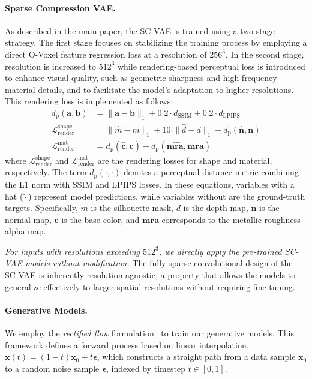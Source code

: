 \documentclass[10pt,twocolumn,letterpaper]{article}
\newcommand{\paravspace}{\vspace{-11pt}}
\begin{document}
\paragraph{Sparse Compression VAE.}
As described in the main paper, the SC-VAE is trained using a two-stage strategy. The first stage focuses on stabilizing the training process by employing a direct O-Voxel feature regression loss at a resolution of $256^3$. In the second stage, resolution is increased to $512^3$ while rendering-based perceptual loss is introduced to enhance visual quality, such as geometric sharpness and high-frequency material details, and to facilitate the model's adaptation to higher resolutions. This rendering loss is implemented as follows:
\begin{equation}
	\begin{split}
        d_{\text{p}}(\boldsymbol{a},\boldsymbol{b}) &= \|\boldsymbol{a}-\boldsymbol{b}\|_1 + 0.2 \cdot d_{\text{SSIM}} + 0.2 \cdot d_{\text{LPIPS}} \\
		\mathcal{L}^{\text{shape}}_{\text{render}} &= \|\hat{m}-m\|_1 + 10 \cdot \|\hat{d}-d\|_1 + d_{\text{p}}(\hat{\boldsymbol{n}}, \boldsymbol{n}) \\
        \mathcal{L}^{\text{mat}}_{\text{render}} &= d_{\text{p}}(\hat{\boldsymbol{c}},\boldsymbol{c}) + d_{\text{p}}(\hat{\boldsymbol{mra}},\boldsymbol{mra})
	\end{split}
	\label{eq:rendering_loss}
\end{equation}
where $\mathcal{L}^{\text{shape}}_{\text{render}}$ and $\mathcal{L}^{\text{mat}}_{\text{render}}$ are the rendering losses for shape and material, respectively. The term $d_{\text{p}}(\cdot, \cdot)$ denotes a perceptual distance metric combining the L1 norm with SSIM and LPIPS losses. In these equations, variables with a hat ($\hat{\cdot}$) represent model predictions, while variables without are the ground-truth targets. Specifically, $m$ is the silhouette mask, $d$ is the depth map, $\boldsymbol{n}$ is the normal map, $\boldsymbol{c}$ is the base color, and $\boldsymbol{mra}$ corresponds to the metallic-roughness-alpha map.

\emph{For inputs with resolutions exceeding $512^3$, we directly apply the pre-trained SC-VAE models without modification.} The fully sparse-convolutional design of the SC-VAE is inherently resolution-agnostic, a property that allows the models to generalize effectively to larger spatial resolutions without requiring fine-tuning.

\paravspace
\paragraph{Generative Models.}
We employ the \emph{rectified flow} formulation~\cite{liu2023flow} to train our generative models. This framework defines a forward process based on linear interpolation, $\boldsymbol{x}(t)=(1-t)\boldsymbol{x}_0+t\boldsymbol{\epsilon}$, which constructs a straight path from a data sample $\boldsymbol{x}_0$ to a random noise sample $\boldsymbol{\epsilon}$, indexed by timestep $t \in [0, 1]$.
\end{document}
